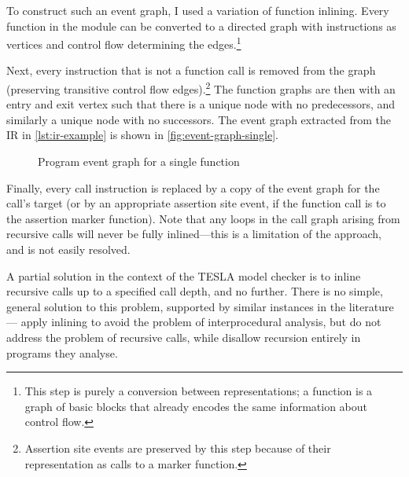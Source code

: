 To construct such an event graph, I used a variation of function
inlining. Every function in the module can be converted to a directed graph
with instructions as vertices and control flow determining the
edges.\footnote{This step is purely a conversion between representations; a
function is a graph of basic blocks that already encodes the same information
about control flow.}

Next, every instruction that is not a function call is removed from the graph
(preserving transitive control flow edges).\footnote{Assertion site events are
preserved by this step because of their representation as calls to a marker
function.} The function graphs are then  with an entry and
exit vertex such that there is a unique node with no predecessors, and similarly
a unique node with no successors. The event graph extracted from the IR in
\autoref{lst:ir-example} is shown in \autoref{fig:event-graph-single}.

\begin{figure}[ht]
  \centering
  \caption{Program event graph for a single function}
  \label{fig:event-graph-single}
\end{figure}

Finally, every call instruction is replaced by a copy of the event graph for the
call's target (or by an appropriate assertion site event, if the function call
is to the assertion marker function). Note that any loops in the call graph
arising from recursive calls will never be fully inlined---this is a limitation
of the approach, and is not easily resolved. 

A partial solution in the context of the TESLA model checker is to inline
recursive calls up to a specified call depth, and no further. There is no
simple, general solution to this problem, supported by similar instances in the
literature---\textcite{henry_pagai:_2012} apply inlining to avoid the problem of
interprocedural analysis, but do not address the problem of recursive calls,
while \textcite{wang_function_2009} disallow recursion entirely in programs they
analyse.

